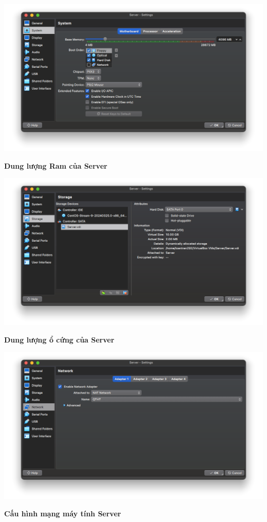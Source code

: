 \begin{minipage}{.93\linewidth}
  \captionsetup{type=figure, skip=-15pt}
  \includegraphics[width=\linewidth]{./imgs/Hinh-3.png}
  \caption{\bfseries Dung lượng Ram của Server}
  \label{fig:server-ram}
\end{minipage}


\begin{minipage}{.93\linewidth}
  \captionsetup{type=figure, skip=-15pt}
  \includegraphics[width=\linewidth]{./imgs/Hinh-5.png}
  \caption{\bfseries Dung lượng ổ cứng của Server}
  \label{fig:server-disk}
\end{minipage}


\begin{minipage}{.93\linewidth}
  \captionsetup{type=figure, skip=-15pt}
  \includegraphics[width=\linewidth]{./imgs/Hinh-6.png}
  \caption{\bfseries Cấu hình mạng máy tính Server}
  \label{fig:server-network-1}
\end{minipage}


